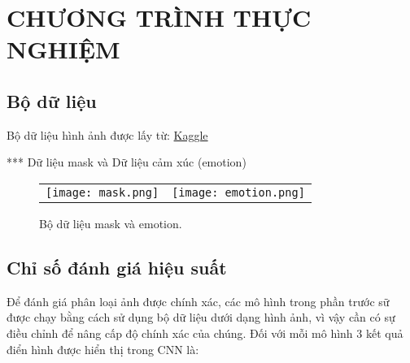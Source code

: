 
\chapter{CHƯƠNG TRÌNH THỰC NGHIỆM} 

\label{Chapter3} 

\section{Bộ dữ liệu}

Bộ dữ liệu hình ảnh được lấy từ: \href{https://www.kaggle.com/datasets/spandanpatnaik09/face-mask-detectormask-not-mask-incorrect-mask}{Kaggle} 

*** Dữ liệu mask và Dữ liệu cảm xúc (emotion)

\begin{figure}[h!] 
	\begin{tabular}{cc}
		\centering
		\texttt{[image: mask.png]} &
		\texttt{[image: emotion.png]} 
	\end{tabular}
	\caption[Bộ dữ liệu mask và emotion.]{Bộ dữ liệu mask và emotion.}
	\label{fig:maskemotion}
\end{figure}

\section{Chỉ số đánh giá hiệu suất}

Để đánh giá phân loại ảnh được chính xác, các mô hình trong phần trước sữ được chạy bằng cách sử dụng bộ dữ liệu dưới dạng hình ảnh, vì vậy cần có sự điều chỉnh để nâng cấp độ chính xác của chúng. Đối với mỗi mô hình 3 kết quả điển hình được hiển thị trong CNN là:

